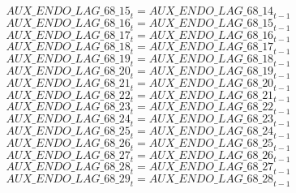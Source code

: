 \begin{dmath}
{AUX\_ENDO\_LAG\_68\_15}_{t}={AUX\_ENDO\_LAG\_68\_14}_{t-1}
\end{dmath}
\begin{dmath}
{AUX\_ENDO\_LAG\_68\_16}_{t}={AUX\_ENDO\_LAG\_68\_15}_{t-1}
\end{dmath}
\begin{dmath}
{AUX\_ENDO\_LAG\_68\_17}_{t}={AUX\_ENDO\_LAG\_68\_16}_{t-1}
\end{dmath}
\begin{dmath}
{AUX\_ENDO\_LAG\_68\_18}_{t}={AUX\_ENDO\_LAG\_68\_17}_{t-1}
\end{dmath}
\begin{dmath}
{AUX\_ENDO\_LAG\_68\_19}_{t}={AUX\_ENDO\_LAG\_68\_18}_{t-1}
\end{dmath}
\begin{dmath}
{AUX\_ENDO\_LAG\_68\_20}_{t}={AUX\_ENDO\_LAG\_68\_19}_{t-1}
\end{dmath}
\begin{dmath}
{AUX\_ENDO\_LAG\_68\_21}_{t}={AUX\_ENDO\_LAG\_68\_20}_{t-1}
\end{dmath}
\begin{dmath}
{AUX\_ENDO\_LAG\_68\_22}_{t}={AUX\_ENDO\_LAG\_68\_21}_{t-1}
\end{dmath}
\begin{dmath}
{AUX\_ENDO\_LAG\_68\_23}_{t}={AUX\_ENDO\_LAG\_68\_22}_{t-1}
\end{dmath}
\begin{dmath}
{AUX\_ENDO\_LAG\_68\_24}_{t}={AUX\_ENDO\_LAG\_68\_23}_{t-1}
\end{dmath}
\begin{dmath}
{AUX\_ENDO\_LAG\_68\_25}_{t}={AUX\_ENDO\_LAG\_68\_24}_{t-1}
\end{dmath}
\begin{dmath}
{AUX\_ENDO\_LAG\_68\_26}_{t}={AUX\_ENDO\_LAG\_68\_25}_{t-1}
\end{dmath}
\begin{dmath}
{AUX\_ENDO\_LAG\_68\_27}_{t}={AUX\_ENDO\_LAG\_68\_26}_{t-1}
\end{dmath}
\begin{dmath}
{AUX\_ENDO\_LAG\_68\_28}_{t}={AUX\_ENDO\_LAG\_68\_27}_{t-1}
\end{dmath}
\begin{dmath}
{AUX\_ENDO\_LAG\_68\_29}_{t}={AUX\_ENDO\_LAG\_68\_28}_{t-1}
\end{dmath}
